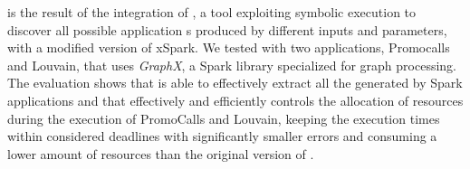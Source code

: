\tool is the result of the integration of \dSymb, a tool exploiting symbolic execution to discover all possible application {\plan}s produced by different inputs and parameters, with a modified version of xSpark.
We tested \tool with two applications, Promocalls and Louvain, that uses \textit{GraphX}, a Spark library specialized for graph processing.
The evaluation shows that \approach is able to effectively extract all the \plans generated by Spark applications and that \tool effectively and efficiently controls the allocation of resources during the execution of PromoCalls and Louvain, keeping the execution times within considered deadlines with significantly smaller errors and consuming a lower amount of resources than the original version of \cSpark.

